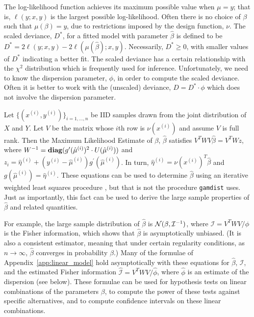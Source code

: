 \documentclass[12pt]{article}
\newcommand{\gamdist}{\texttt{gamdist}}
\begin{document}
The log-likelihood function achieves its maximum possible value when $\mu = y$; that is, $\ell(y; x, y)$ is the largest possible log-likelihood. Often there is no choice of $\beta$ such that $\mu(\beta) = y$, due to restrictions imposed by the design function, $\nu$. The scaled deviance, $D^*$, for a fitted model with parameter $\hat{\beta}$ is defined to be $D^* = 2 \ell(y; x, y) - 2 \ell(\mu(\hat{\beta}); x, y)$. Necessarily, $D^* \geq 0$, with smaller values of $D^*$ indicating a better fit. The scaled deviance has a certain relationship with the $\chi^2$ distribution which is frequently used for inference. Unfortunately, we need to know the dispersion parameter, $\phi$, in order to compute the scaled deviance. Often it is better to work with the (unscaled) deviance, $D = D^* \cdot \phi$ which does not involve the dispersion parameter.

Let $\{ (x^{(i)}, y^{(i)}) \}_{i=1, \ldots, n}$ be IID samples drawn from the joint distribution of $X$ and $Y$. Let $V$ be the matrix whose $i$th row is $\nu(x^{(i)})$ and assume $V$ is full rank. Then the Maximum Likelihood Estimate of $\beta$, $\hat{\beta}$ satisfies $V^T W V \hat{\beta} = V^T W z$, where $W^{-1} = \mathop{\bf diag}(g^\prime(\hat{\mu}^{(i)})^2 \cdot U(\hat{\mu}^{(i)}))$ and $z_i = \hat{\eta}^{(i)} + (y^{(i)} - \hat{\mu}^{(i)}) g^\prime(\hat{\mu}^{(i)})$. In turn, $\hat{\eta}^{(i)} = \nu(x^{(i)})^T \hat{\beta}$ and $g(\hat{\mu}^{(i)}) = \hat{\eta}^{(i)}$. These equations can be used to determine $\hat{\beta}$ using an iterative weighted least squares procedure \cite[\S 2.5]{MN:1983}, but that is not the procedure \gamdist{} uses. Just as importantly, this fact can be used to derive the large sample properties of $\hat{\beta}$ and related quantities.

For example, the large sample distribution of $\hat{\beta}$ is ${\mathcal N}(\beta,  \mathcal{I}^{-1})$, where $\mathcal{I} = V^T W V / \phi$ is the Fisher information, which shows that $\hat{\beta}$ is asymptotically unbiased. (It is also a consistent estimator, meaning that under certain regularity conditions, as $n \to \infty$, $\hat{\beta}$ converges in probability $\beta$.) Many of the formulae of Appendix~\ref{app:linear_model} hold asymptotically with these equations for $\hat{\beta}$, $\mathcal{I}$, and the estimated Fisher information $\hat{\mathcal{I}} = V^T W V / \hat{\phi}$, where $\hat{\phi}$ is an estimate of the dispersion (see below). These formulae can be used for hypothesis tests on linear combinations of the parameters $\beta$, to compute the power of these tests against specific alternatives, and to compute confidence intervals on these linear combinations.
\end{document}
